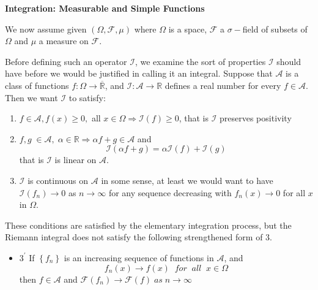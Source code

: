 \setcounter{lecture}{10}
\begin{center}
	\Large \bf Integration: Measurable and Simple Functions
\end{center}
\vspace{0.25cm}

We now assume given $\left( {\Omega ,\mathcal{F},\mu } \right)$ where $\Omega$ is a space, $\mathcal{F}$ a $\sigma-$field of subsets of $\Omega$ and $\mu$ a measure on $\mathcal{F}$.


Before defining such an operator $\mathcal{I}$, we examine the sort of properties $\mathcal{I}$ should have before we would be justified in calling it an integral. Suppose that $\mathcal{A}$ is a class of functions $f:\Omega  \to \overline {\mathbb{R}} $, and $\mathcal{I}:\mathcal{A} \to\mathbb{R}$ defines a real number for every $ f \in \mathcal{A} $. Then we want $\mathcal{I}$ to satisfy:
\begin{enumerate}
	\item $f \in \mathcal{A},f\left( x \right) \geqslant 0,$ all $ x \in \Omega  \Rightarrow \mathcal{I}\left( f \right) \geqslant 0$, that is $\mathcal{I}$ preserves positivity 
	\item $f,g\; \in {\mathcal{A}},\;\alpha  \in \mathbb{R} \Rightarrow \alpha f + g \in \mathcal{A}$ and
	\begin{equation}
	\mathcal{I}\left( {\alpha f + g} \right) = \alpha \mathcal{I}\left( f \right) + \mathcal{I}\left( g \right)
	\end{equation}
	that is $\mathcal{I}$ is linear on $\mathcal{A}$.
	\item $\mathcal{I}$ is continuous on $\mathcal{A}$ in some sense, at least we would want to have $\mathcal{I}\left( {{f_n}} \right) \to 0$ as $ n \to \infty $ for any sequence decreasing with ${f_n}\left( x \right) \to 0$ for all $ x $ in $\Omega$.
\end{enumerate}

These conditions are satisfied by the elementary integration process, but the Riemann integral does not satisfy the following strengthened form of $ 3 $.

\begin{itemize}
	\item  $ 3^{\prime} $ If $\left\{ {{f_n}} \right\}$ is an increasing sequence of functions in $\mathcal{A}$, and 
	\begin{equation}
	{f_n}\left( x \right) \to f\left( x \right)\;\;for\;\;all\;\;x \in \Omega 
	\end{equation}
	then $ f \in \mathcal{A} $ and $\mathcal{F}\left( {{f_n}} \right) \to \mathcal{F}\left( f \right)\;as\;n \to \infty $
\end{itemize}
 
